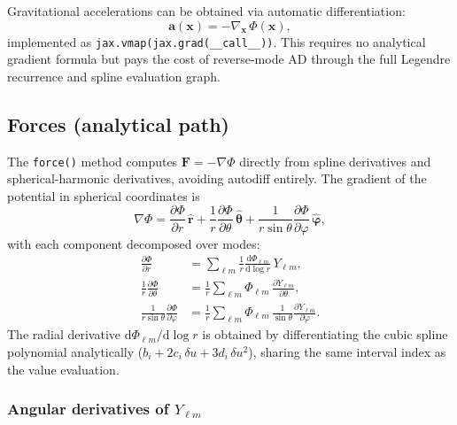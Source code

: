 \documentclass[11pt]{article}
\begin{document}
Gravitational accelerations can be obtained via automatic differentiation:
\begin{equation}
  \mathbf{a}(\mathbf{x}) = -\nabla_{\mathbf{x}}\,\Phi(\mathbf{x}),
\end{equation}
implemented as \texttt{jax.vmap(jax.grad(\_\_call\_\_))}.  This requires no
analytical gradient formula but pays the cost of reverse-mode AD through the
full Legendre recurrence and spline evaluation graph.

\subsection{Forces (analytical path)}
\label{sec:analytical_force}

The \texttt{force()} method computes $\mathbf{F} = -\nabla\Phi$ directly from
spline derivatives and spherical-harmonic derivatives, avoiding autodiff
entirely.  The gradient of the potential in spherical coordinates is
\begin{equation}
  \nabla\Phi = \frac{\partial\Phi}{\partial r}\,\hat{\mathbf{r}}
  + \frac{1}{r}\frac{\partial\Phi}{\partial\theta}\,\hat{\boldsymbol\theta}
  + \frac{1}{r\sin\theta}\frac{\partial\Phi}{\partial\varphi}\,\hat{\boldsymbol\varphi},
\end{equation}
with each component decomposed over modes:
\begin{align}
  \frac{\partial\Phi}{\partial r}
    &= \sum_{\ell m} \frac{1}{r}\frac{\mathrm{d}\Phi_{\ell m}}{\mathrm{d}\!\log r}\, Y_{\ell m}, \\
  \frac{1}{r}\frac{\partial\Phi}{\partial\theta}
    &= \frac{1}{r}\sum_{\ell m} \Phi_{\ell m}\,\frac{\partial Y_{\ell m}}{\partial\theta}, \\
  \frac{1}{r\sin\theta}\frac{\partial\Phi}{\partial\varphi}
    &= \frac{1}{r}\sum_{\ell m} \Phi_{\ell m}\,\frac{1}{\sin\theta}\frac{\partial Y_{\ell m}}{\partial\varphi}.
\end{align}
The radial derivative $\mathrm{d}\Phi_{\ell m}/\mathrm{d}\!\log r$ is obtained
by differentiating the cubic spline polynomial analytically ($b_i + 2c_i\,\delta u
+ 3d_i\,\delta u^2$), sharing the same interval index as the value evaluation.

\subsubsection{Angular derivatives of $Y_{\ell m}$}
\end{document}
